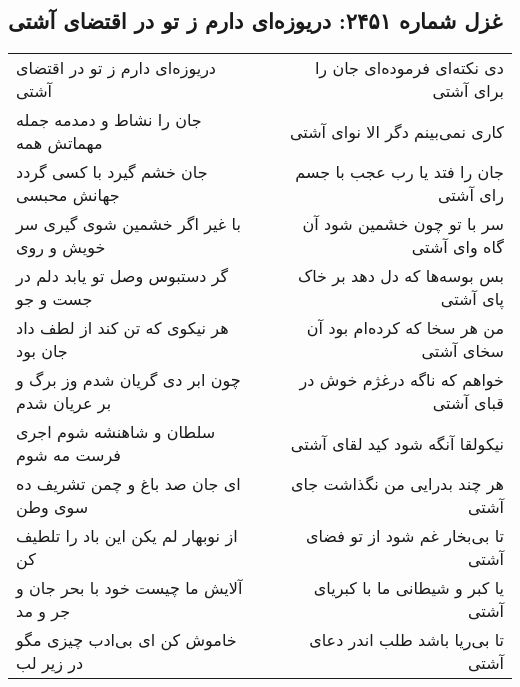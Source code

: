 \begin{center}
\section*{غزل شماره ۲۴۵۱: دریوزه‌ای دارم ز تو در اقتضای آشتی}
\label{sec:2451}
\begin{longtable}{l p{0.5cm} r}
دریوزه‌ای دارم ز تو در اقتضای آشتی
&&
دی نکته‌ای فرموده‌ای جان را برای آشتی
\\
جان را نشاط و دمدمه جمله مهماتش همه
&&
کاری نمی‌بینم دگر الا نوای آشتی
\\
جان خشم گیرد با کسی گردد جهانش محبسی
&&
جان را فتد یا رب عجب با جسم رای آشتی
\\
با غیر اگر خشمین شوی گیری سر خویش و روی
&&
سر با تو چون خشمین شود آن گاه وای آشتی
\\
گر دستبوس وصل تو یابد دلم در جست و جو
&&
بس بوسه‌ها که دل دهد بر خاک پای آشتی
\\
هر نیکوی که تن کند از لطف داد جان بود
&&
من هر سخا که کرده‌ام بود آن سخای آشتی
\\
چون ابر دی گریان شدم وز برگ و بر عریان شدم
&&
خواهم که ناگه درغژم خوش در قبای آشتی
\\
سلطان و شاهنشه شوم اجری فرست مه شوم
&&
نیکولقا آنگه شود کید لقای آشتی
\\
ای جان صد باغ و چمن تشریف ده سوی وطن
&&
هر چند بدرایی من نگذاشت جای آشتی
\\
از نوبهار لم یکن این باد را تلطیف کن
&&
تا بی‌بخار غم شود از تو فضای آشتی
\\
آلایش ما چیست خود با بحر جان و جر و مد
&&
یا کبر و شیطانی ما با کبریای آشتی
\\
خاموش کن ای بی‌ادب چیزی مگو در زیر لب
&&
تا بی‌ریا باشد طلب اندر دعای آشتی
\\
\end{longtable}
\end{center}
